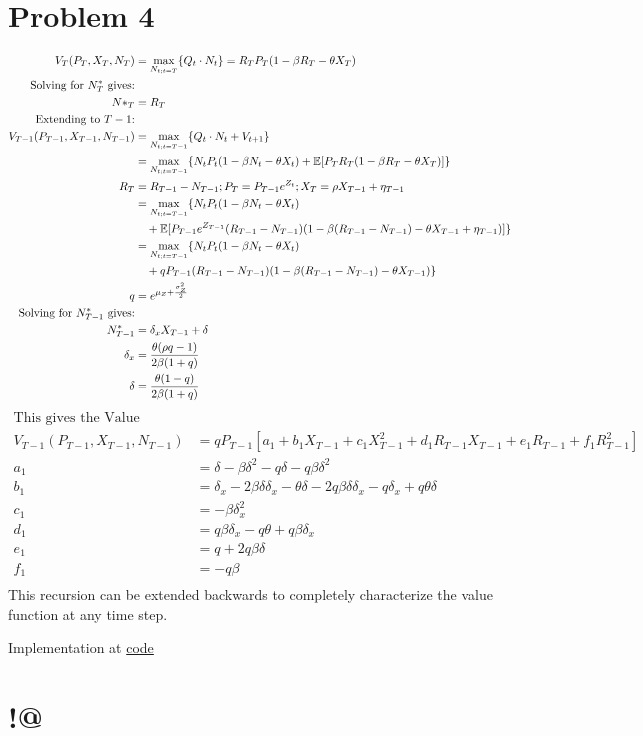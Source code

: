 \documentclass[11pt]{article}
\begin{document}
\section*{Problem 4}
\begin{align}
    V_T(P_T, X_T, N_T) &= \max_{N_{t; t=T}}\{ Q_t\cdot N_t \} = R_TP_T(1-\beta R_T - \theta X_T) \\
    \text{Solving for $N^*_T$ gives:} \\
    N*_T &= R_T \\
    \text{Extending to $T-1$:} \\
    V_{T-1}(P_{T-1}, X_{T-1}, N_{T-1}) &= \max_{N_{t; t=T-1}} \{ Q_t\cdot N_t + V_{t+1}\}\\
    &= \max_{N_{t; t=T-1}}\{N_tP_t(1-\beta N_t - \theta X_t) + \mathbb{E}[P_TR_T(1-\beta R_T - \theta X_T)] \} \\
    R_T &= R_{T-1} - N_{T-1}; P_T = P_{T-1}e^{Z_t}; X_T = \rho X_{T-1} + \eta_{T-1} \\
    &= \max_{N_{t; t=T-1}}\{N_tP_t(1-\beta N_t - \theta X_t) \\
    &\quad+ \mathbb{E}[P_{T-1}e^{Z_{T-1}}(R_{T-1} - N_{T-1})(1-\beta (R_{T-1} - N_{T-1}) - \theta X_{T-1} + \eta_{T-1})] \} \\
    &= \max_{N_{t; t=T-1}}\{N_tP_t(1-\beta N_t - \theta X_t) \\
    &\quad+ q P_{T-1} (R_{T-1} - N_{T-1})(1-\beta (R_{T-1} - N_{T-1}) - \theta X_{T-1})\} \\
    q& = e^{\mu_Z + \frac{\sigma^2_Z}{2}} \\
    \text{Solving for $N^*_{T-1}$ gives:} \\
    N^*_{T-1} &= \delta_x X_{T-1} + \delta \\
    \delta_x &= \frac{\theta(\rho q - 1)}{2\beta(1 + q)} \\
    \delta &= \frac{\theta(1 - q)}{2\beta(1 + q)} \\
\end{align}
\begin{align}
    \text{This gives the Value Function as:} \\
    V_{T-1}(P_{T-1}, X_{T-1}, N_{T-1}) &= qP_{T-1}[a_1 + b_1X_{T-1} + c_1X_{T-1}^2 + d_1 R_{T-1}X_{T-1} + e_1R_{T-1} + f_1 R^2_{T-1}] \\
    a_1 &= \delta - \beta \delta^2 - q\delta - q\beta \delta^2\\
    b_1 &= \delta_x - 2\beta \delta \delta_x - \theta\delta - 2q\beta \delta\delta_x  - q\delta_x + q\theta\delta\\
    c_1 &= -\beta\delta_x^2\\
    d_1 &= q\beta\delta_x - q\theta + q\beta\delta_x\\
    e_1 &= q + 2q\beta\delta\\
    f_1 &= -q\beta\\
\end{align}
This recursion can be extended backwards to completely characterize the value function at any time step.

Implementation at \href{https://github.com/MatthewWilsonThomas/CME241-RLForFinance/blob/master/Problem%20Sets/Assignment_5/Q4-LPT.py}{code}


\newpage
\section{!@}
\end{document}
